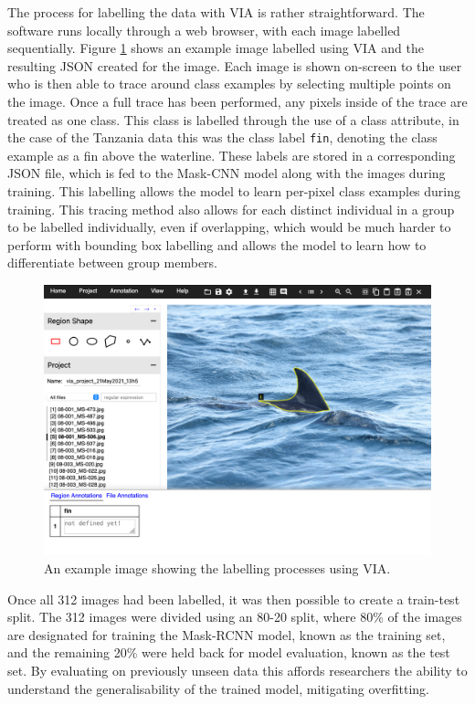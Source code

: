The process for labelling the data with VIA is rather straightforward. The software runs locally through a web browser, with each image labelled sequentially. Figure \ref{fig:via-json-example-zanzibar} shows an example image labelled using VIA and the resulting JSON created for the image. Each image is shown on-screen to the user who is then able to trace around class examples by selecting multiple points on the image. Once a full trace has been performed, any pixels inside of the trace are treated as one class. This class is labelled through the use of a class attribute, in the case of the Tanzania data this was the class label \texttt{fin}, denoting the class example as a fin above the waterline. These labels are stored in a corresponding JSON file, which is fed to the Mask-CNN model along with the images during training. This labelling allows the model to learn per-pixel class examples during training. This tracing method also allows for each distinct individual in a group to be labelled individually, even if overlapping, which would be much harder to perform with bounding box labelling and allows the model to learn how to differentiate between group members.  

  \begin{figure}
	\begin{center}
		\includegraphics[scale=0.4]{Chapter3/figs/via-json-example-zanzibar-1.png}
	\end{center}
	\caption{An example image showing the labelling processes using VIA.
	}
	\label{fig:via-json-example-zanzibar}
\end{figure}

Once all 312 images had been labelled, it was then possible to create a train-test split. The 312 images were divided using an 80-20 split, where 80\% of the images are designated for training the Mask-RCNN model, known as the training set, and the remaining 20\% were held back for model evaluation, known as the test set. By evaluating on previously unseen data this affords researchers the ability to understand the generalisability of the trained model, mitigating overfitting. 


